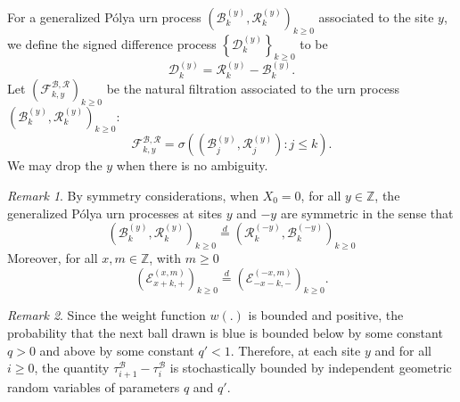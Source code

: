 \documentclass[twoside,12pt, a4paper]{article}
\numberwithin{equation}{section}
\theoremstyle{remark}
\newtheorem{remark}{Remark}[section]
\begin{document}
	For a generalized P\'{o}lya urn process $(\mathcal{B}^{(y)}_k,\mathcal{R}^{(y)}_k )_{k\geq 0}$ associated to the site $y$, we define the signed difference process $\left\{\mathcal{D}^{(y)}_{k}\right\}_{k \ge 0} $ to be
	\begin{equation}\label{eq:signed difference}
		\mathcal{D}^{(y)}_k  =\mathcal{R}^{(y)}_k -\mathcal{B}^{(y)}_k.  
	\end{equation}
	Let $\left(\mathcal{F}^{\mathcal{B},\mathcal{R}}_{k, y}\right)_{k \ge 0}$ be the natural filtration associated to the urn process $(\mathcal{B}^{(y)}_k,\mathcal{R}^{(y)}_k )_{k\geq 0}$:  
	\[
	\mathcal{F}^{\mathcal{B},\mathcal{R}}_{k, y} = \sigma\left((\mathcal{B}_j^{(y)},\mathcal{R}_j^{(y)} ): j\leq k \right).
	\]  
	We may drop the $y$ when there is no ambiguity.
	\begin{remark}
		\label{rem:symmetry}
		By symmetry considerations, when $X_0 = 0$, for all $y \in \mathbb{Z}$, the generalized P\'{o}lya urn processes at sites $y$ and $-y$ are symmetric in the sense that
		$$\left(\mathcal{B}^{(y)}_{k},\mathcal{R}^{(y)}_{k} \right)_{k\ge 0}
		\overset{d}{=} 
		\left(\mathcal{R}^{(-y)}_{k},\mathcal{B}^{(-y)}_{k} \right)_{k\ge 0} $$
		Moreover, for all $x, m \in \mathbb{Z}$, with $m\geq 0$
		\[
		\left(\mathcal{E}^{(x,m)}_{x+k,+} \right)_{k\geq 0} \overset{d}{=} \left(\mathcal{E}^{(-x,m)}_{-x-k,-} \right)_{k\geq 0}.
		\]
	\end{remark}
	\begin{remark}
		\label{rk:UrnGeo}
		Since the weight function $w(.)$ is bounded and positive, the probability that the next ball drawn is blue is bounded below by some constant $q > 0$ and above by some constant $q' < 1$. Therefore, at each site $y$ and for all $i \ge 0$, the quantity $\tau_{i+1}^{\mathcal{B}} - \tau_{i}^{\mathcal{B}}$ is stochastically bounded by independent geometric random variables of parameters $q$ and $q'$. 
	\end{remark}
	
\end{document}
